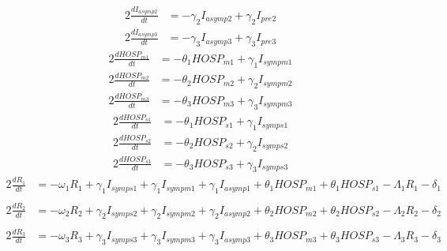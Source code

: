\documentclass{article}%
\begin{document}
\begin{alignat*}{2}%
\frac{dI_{asymp2}}{dt} &= -\gamma_{2} I_{asymp2} +  \gamma_{2} I_{pre2}%
\end{alignat*}%
\begin{alignat*}{2}%
\frac{dI_{asymp3}}{dt} &= -\gamma_{3} I_{asymp3} +  \gamma_{3} I_{pre3}%
\end{alignat*}%
\begin{alignat*}{2}%
\frac{dHOSP_{m1}}{dt} &= -\theta_{1} HOSP_{m1} +  \gamma_{1} I_{sympm1}%
\end{alignat*}%
\begin{alignat*}{2}%
\frac{dHOSP_{m2}}{dt} &= -\theta_{2} HOSP_{m2} +  \gamma_{2} I_{sympm2}%
\end{alignat*}%
\begin{alignat*}{2}%
\frac{dHOSP_{m3}}{dt} &= -\theta_{3} HOSP_{m3} +  \gamma_{3} I_{sympm3}%
\end{alignat*}%
\begin{alignat*}{2}%
\frac{dHOSP_{s1}}{dt} &= -\theta_{1} HOSP_{s1} +  \gamma_{1} I_{symps1}%
\end{alignat*}%
\begin{alignat*}{2}%
\frac{dHOSP_{s2}}{dt} &= -\theta_{2} HOSP_{s2} +  \gamma_{2} I_{symps2}%
\end{alignat*}%
\begin{alignat*}{2}%
\frac{dHOSP_{s3}}{dt} &= -\theta_{3} HOSP_{s3} +  \gamma_{3} I_{symps3}%
\end{alignat*}%
\begin{alignat*}{2}%
\frac{dR_{1}}{dt} &= -\omega_{1} R_{1} +  \gamma_{1} I_{symps1} +  \gamma_{1} I_{sympm1} +  \gamma_{1} I_{asymp1} +  \theta_{1} HOSP_{m1} +  \theta_{1} HOSP_{s1} -\Lambda_{1} R_{1}  -\delta_{1} \\ &%
\end{alignat*}%
\begin{alignat*}{2}%
\frac{dR_{2}}{dt} &= -\omega_{2} R_{2} +  \gamma_{2} I_{symps2} +  \gamma_{2} I_{sympm2} +  \gamma_{2} I_{asymp2} +  \theta_{2} HOSP_{m2} +  \theta_{2} HOSP_{s2} -\Lambda_{2} R_{2}  -\delta_{2} \\ &%
\end{alignat*}%
\begin{alignat*}{2}%
\frac{dR_{3}}{dt} &= -\omega_{3} R_{3} +  \gamma_{3} I_{symps3} +  \gamma_{3} I_{sympm3} +  \gamma_{3} I_{asymp3} +  \theta_{3} HOSP_{m3} +  \theta_{3} HOSP_{s3} -\Lambda_{3} R_{3}  -\delta_{3} \\ &%
\end{alignat*}%
\end{document}
